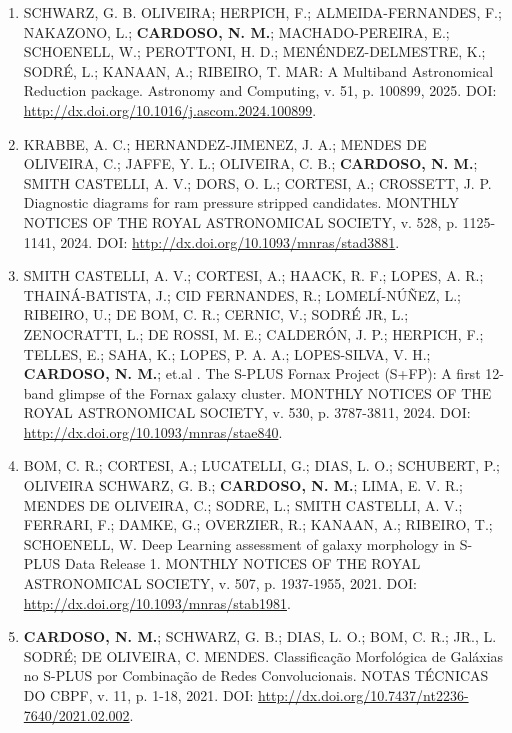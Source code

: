 \begin{enumerate}
  \item SCHWARZ, G. B. OLIVEIRA; HERPICH, F.; ALMEIDA-FERNANDES, F.; NAKAZONO, L.; \textbf{CARDOSO, N. M.}; MACHADO-PEREIRA, E.; SCHOENELL, W.; PEROTTONI, H. D.; MENÉNDEZ-DELMESTRE, K.; SODRÉ, L.; KANAAN, A.; RIBEIRO, T. MAR: A Multiband Astronomical Reduction package. Astronomy and Computing, v. 51, p. 100899, 2025. DOI: \url{http://dx.doi.org/10.1016/j.ascom.2024.100899}.
  \item KRABBE, A. C.; HERNANDEZ-JIMENEZ, J. A.; MENDES DE OLIVEIRA, C.; JAFFE, Y. L.; OLIVEIRA, C. B.; \textbf{CARDOSO, N. M.}; SMITH CASTELLI, A. V.; DORS, O. L.; CORTESI, A.; CROSSETT, J. P. Diagnostic diagrams for ram pressure stripped candidates. MONTHLY NOTICES OF THE ROYAL ASTRONOMICAL SOCIETY, v. 528, p. 1125-1141, 2024. DOI: \url{http://dx.doi.org/10.1093/mnras/stad3881}.
  \item SMITH CASTELLI, A. V.; CORTESI, A.; HAACK, R. F.; LOPES, A. R.; THAINÁ-BATISTA, J.; CID FERNANDES, R.; LOMELÍ-NÚÑEZ, L.; RIBEIRO, U.; DE BOM, C. R.; CERNIC, V.; SODRÉ JR, L.; ZENOCRATTI, L.; DE ROSSI, M. E.; CALDERÓN, J. P.; HERPICH, F.; TELLES, E.; SAHA, K.; LOPES, P. A. A.; LOPES-SILVA, V. H.; \textbf{CARDOSO, N. M.}; et.al . The S-PLUS Fornax Project (S+FP): A first 12-band glimpse of the Fornax galaxy cluster. MONTHLY NOTICES OF THE ROYAL ASTRONOMICAL SOCIETY, v. 530, p. 3787-3811, 2024. DOI: \url{http://dx.doi.org/10.1093/mnras/stae840}.
  \item BOM, C. R.; CORTESI, A.; LUCATELLI, G.; DIAS, L. O.; SCHUBERT, P.; OLIVEIRA SCHWARZ, G. B.; \textbf{CARDOSO, N. M.}; LIMA, E. V. R.; MENDES DE OLIVEIRA, C.; SODRE, L.; SMITH CASTELLI, A. V.; FERRARI, F.; DAMKE, G.; OVERZIER, R.; KANAAN, A.; RIBEIRO, T.; SCHOENELL, W. Deep Learning assessment of galaxy morphology in S-PLUS Data Release 1. MONTHLY NOTICES OF THE ROYAL ASTRONOMICAL SOCIETY, v. 507, p. 1937-1955, 2021. DOI: \url{http://dx.doi.org/10.1093/mnras/stab1981}.
  \item \textbf{CARDOSO, N. M.}; SCHWARZ, G. B.; DIAS, L. O.; BOM, C. R.; JR., L. SODRÉ; DE OLIVEIRA, C. MENDES. Classificação Morfológica de Galáxias no S-PLUS por Combinação de Redes Convolucionais. NOTAS TÉCNICAS DO CBPF, v. 11, p. 1-18, 2021. DOI: \url{http://dx.doi.org/10.7437/nt2236-7640/2021.02.002}.
\end{enumerate}


